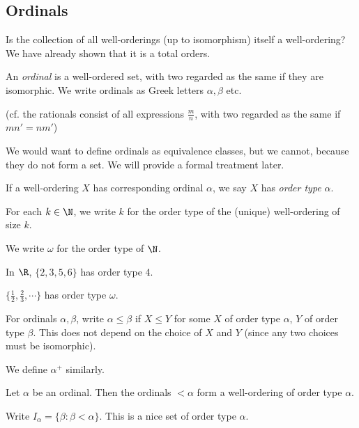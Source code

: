 \documentclass[a4paper]{article}
\begin{document}
\subsection{Ordinals}
Is the collection of all well-orderings (up to isomorphism) itself a well-ordering? We have already shown that it is a total orders.

\begin{defi}[Ordinal]
  An \emph{ordinal} is a well-ordered set, with two regarded as the same if they are isomorphic. We write ordinals as Greek letters $\alpha, \beta$ etc.

  (cf. the rationals consist of all expressions $\frac{m}{n}$, with two regarded as the same if $mn' = nm'$)
\end{defi}
We would want to define ordinals as equivalence classes, but we cannot, because they do not form a set. We will provide a formal treatment later.

\begin{defi}
  If a well-ordering $X$ has corresponding ordinal $\alpha$, we say $X$ has \emph{order type} $\alpha$.
\end{defi}

\begin{notation}
  For each $k\in \N$, we write $k$ for the order type of the (unique) well-ordering of size $k$.

  We write $\omega$ for the order type of $\N$.
\end{notation}

\begin{eg}
  In $\R$, $\{2, 3, 5 ,6\}$ has order type 4.

  $\{\frac{1}{2}, \frac{2}{3}, \cdots\}$ has order type $\omega$.
\end{eg}

\begin{notation}
  For ordinals $\alpha, \beta$, write $\alpha \leq \beta$ if $X\leq Y$ for some $X$ of order type $\alpha$, $Y$ of order type $\beta$. This does not depend on the choice of $X$ and $Y$ (since any two choices must be isomorphic).

  We define $\alpha^+$ similarly.
\end{notation}

\begin{prop}
  Let $\alpha$ be an ordinal. Then the ordinals $<\alpha$ form a well-ordering of order type $\alpha$.
\end{prop}

\begin{notation}
  Write $I_\alpha = \{\beta: \beta < \alpha\}$. This is a nice set of order type $\alpha$.
\end{notation}
\end{document}
